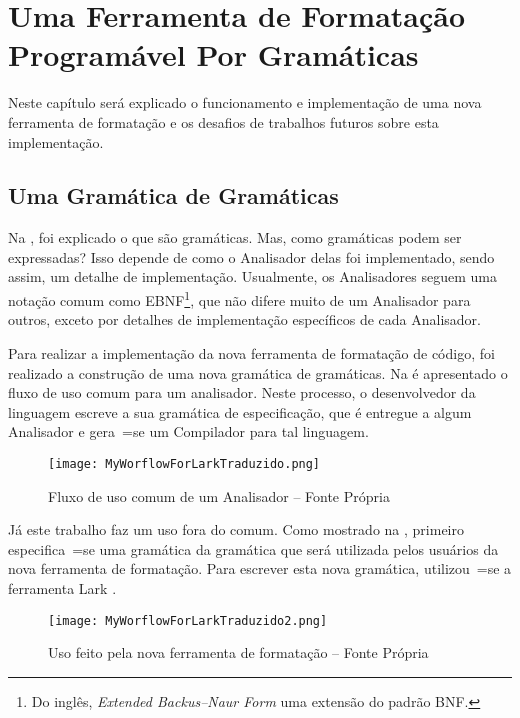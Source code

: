 

\chapter{Uma Ferramenta de Formatação Programável Por Gramáticas}
\label{software_implementation}

Neste capítulo será explicado o funcionamento e
implementação de uma nova ferramenta de formatação e
os desafios de trabalhos futuros sobre esta implementação.


\section{Uma Gramática de Gramáticas}

Na ,
foi explicado o que são gramáticas.
Mas,
como gramáticas podem ser expressadas?
Isso depende de como o Analisador delas foi implementado,
sendo assim,
um detalhe de implementação.
Usualmente,
os Analisadores seguem uma notação comum como EBNF\footnote{
Do inglês,
\textit{Extended Backus–Naur Form} uma extensão do padrão BNF.
}\cite{teachingEbnf,antlrBookTerrentParr},
que não difere muito de um Analisador para outros,
exceto por detalhes de implementação específicos de cada Analisador.

Para realizar a implementação da nova ferramenta de formatação de código,
foi realizado a construção de uma nova gramática de gramáticas.
Na  é apresentado o fluxo de uso comum para um analisador.
Neste processo,
o desenvolvedor da linguagem escreve a sua gramática de especificação,
que é entregue a algum Analisador e gera~=se um Compilador para tal linguagem.
\begin{figure}[h]
\centering
\texttt{[image: MyWorflowForLarkTraduzido.png]}
\caption[Fluxo de uso comum de um Analisador]{Fluxo de uso comum de um Analisador -- Fonte Própria}
\label{MyWorflowForLarkTraduzido}
\end{figure}

Já este trabalho faz um uso fora do comum.
Como mostrado na ,
primeiro especifica~=se uma gramática da gramática que será utilizada pelos usuários da nova ferramenta de formatação.
Para escrever esta nova gramática,
utilizou~=se a ferramenta Lark \cite{larkContextualLexer}.
\begin{figure}[h]
\centering
\texttt{[image: MyWorflowForLarkTraduzido2.png]}
\caption[Uso feito pela nova ferramenta de formatação]{Uso feito pela nova ferramenta de formatação -- Fonte Própria}
\label{MyWorflowForLarkTraduzido2}
\end{figure}

